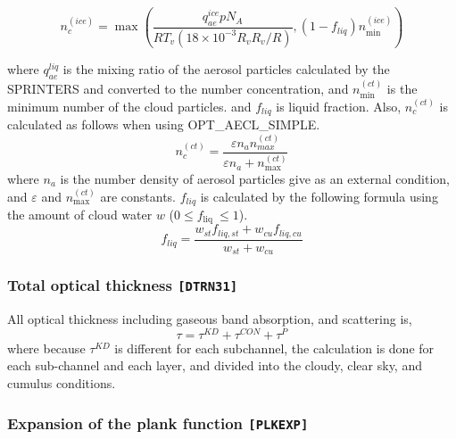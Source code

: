 \begin{equation}
n_{c}^{(i c e)}=\max \left(\frac{q_{a e}^{i c e} p N_{A}}{R T_{v}\left(18 \times 10^{-3} R_{v} R_{v} / R\right)},\left(1-f_{l i q}\right) n_{\min }^{(i c e)}\right)
\end{equation}

where \(q_{a e}^{l i q}\) is the mixing ratio of the aerosol particles
calculated by the SPRINTERS and converted to the number concentration,
and \(n_{\min }^{(c t)}\) is the minimum number of the cloud particles.
and \(f_{liq}\) is liquid fraction. Also, \(n_{c}^{(c t)}\) is
calculated as follows when using OPT\_AECL\_SIMPLE. \begin{equation}
n_{c}^{(c t)}=\frac{\varepsilon n_{a} n_{m a x}^{(c t)}}{\varepsilon n_{a}+n_{\max }^{(c t)}}
\end{equation} where \(n_a\) is the number density of aerosol particles give as an
external condition, and \(\varepsilon\) and \(n_{\max }^{(c t)}\) are
constants. \(f_{liq}\) is calculated by the following formula using the
amount of cloud water \(w\) (\(0 \leq f_{\text {liq }} \leq 1\)). \begin{equation}
f_{l i q}=\frac{w_{s t} f_{l i q, s t}+w_{c u} f_{l i q, c u}}{w_{s t}+w_{c u}}
\end{equation}

\hypertarget{total-optical-thickness-dtrn31}{%
\subsubsection{\texorpdfstring{Total optical thickness
\texttt{{[}DTRN31{]}}}{Total optical thickness {[}DTRN31{]}}}\label{total-optical-thickness-dtrn31}}

All optical thickness including gaseous band absorption, and scattering
is, \begin{equation}
\tau=\tau^{K D}+\tau^{C O N}+\tau^{P}
\end{equation} where because \(\tau^{K D}\) is different for each subchannel, the
calculation is done for each sub-channel and each layer, and divided
into the cloudy, clear sky, and cumulus conditions.

\hypertarget{expansion-of-the-plank-function-plkexp}{%
\subsubsection{\texorpdfstring{Expansion of the plank function
\texttt{{[}PLKEXP{]}}}{Expansion of the plank function {[}PLKEXP{]}}}\label{expansion-of-the-plank-function-plkexp}}

